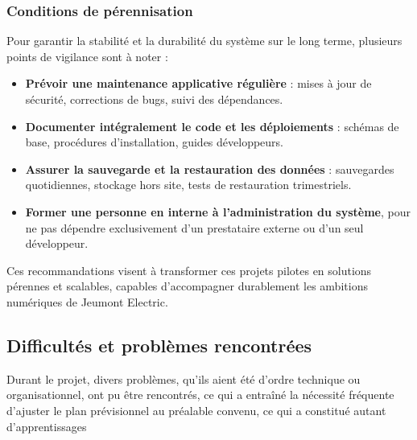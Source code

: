\documentclass[11pt,a4paper]{article}
\begin{document}
\subsubsection{Conditions de pérennisation}

Pour garantir la stabilité et la durabilité du système sur le long terme, plusieurs points de vigilance sont à noter :

\begin{itemize}
    \item \textbf{Prévoir une maintenance applicative régulière} : mises à jour de sécurité, corrections de bugs, suivi des dépendances.
    \item \textbf{Documenter intégralement le code et les déploiements} : schémas de base, procédures d’installation, guides développeurs.
    \item \textbf{Assurer la sauvegarde et la restauration des données} : sauvegardes quotidiennes, stockage hors site, tests de restauration trimestriels.
    \item \textbf{Former une personne en interne à l’administration du système}, pour ne pas dépendre exclusivement d’un prestataire externe ou d’un seul développeur.
\end{itemize}

Ces recommandations visent à transformer ces projets pilotes en solutions pérennes et scalables, capables d’accompagner durablement les ambitions numériques de Jeumont Electric.

\subsection{Difficultés et problèmes rencontrées}
Durant le projet, divers problèmes, qu’ils aient été d’ordre technique ou organisationnel, ont pu être rencontrés, ce qui a entraîné la nécessité fréquente d’ajuster le plan prévisionnel au préalable convenu, ce qui a constitué autant d’apprentissages
\end{document}
